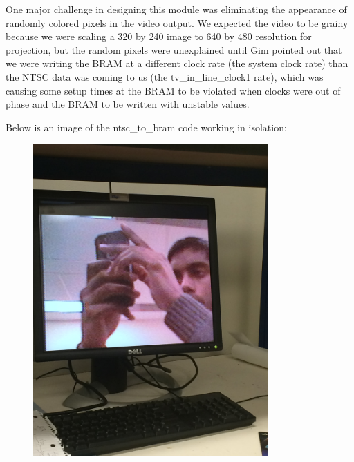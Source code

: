 \documentclass{article}
\begin{document}
One major challenge in designing this module was eliminating the appearance of randomly colored pixels in the video output. We expected the video to be grainy because we were scaling a 320 by 240 image to 640 by 480 resolution for projection, but the random pixels were unexplained until Gim pointed out that we were writing the BRAM at a different clock rate (the system clock rate) than the NTSC data was coming to us (the tv\_in\_line\_clock1 rate), which was causing some setup times at the BRAM to be violated when clocks were out of phase and the BRAM to be written with unstable values.

Below is an image of the ntsc\_to\_bram code working in isolation:
\begin{center}
\begin{figure}[H]
\includegraphics[width=0.8\textwidth, angle=270]{./img/ntsc-complete}
\end{figure}
\end{center}
\end{document}
